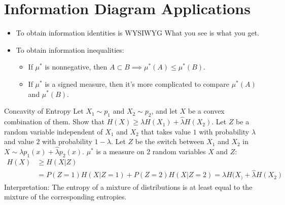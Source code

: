\documentclass[../main.tex]{subfiles}
\begin{document}
\section{Information Diagram Applications}
\begin{itemize}
    \item To obtain information identities is WYSIWYG What you see is what you get.
    \item To obtain information inequalities:\begin{itemize}
        \item If $\mu^*$ is nonnegative, then $A\subset B\implies \mu^*(A)\leq \mu^*(B)$.
        \item If $\mu^*$ is a signed measure, then it's more complicated to compare $\mu^*(A)$ and $\mu^*(B)$.
    \end{itemize}
\end{itemize}
\begin{pbox}{Concavity of Entropy}
    Let $X_1\sim p_1$ and $X_2\sim p_2$, and let $X$ be a convex combination of them. Show that $H(X)
    \geq \lambda H(X_1) + \hat{\lambda}H(X_2)$.
    \newline
    Let $Z$ be a random variable independent of $X_1$ and $X_2$ that takes value $1$ with probability $\lambda$ and value $2$ with probability $1-\lambda$. Let $Z$ be the switch between $X_1$ and $X_2$ in $X\sim \lambda p_1(x)+\hat{\lambda}p_2(x)$. $\mu^*$ is a measure on 2 random variables $X$ and $Z$:
    \begin{align*}
        H(X)&\geq H(X|Z)\\
        &= P(Z=1)H(X|Z=1) + P(Z=2)H(X|Z=2)
        =\lambda H(X_)+\hat{\lambda}H(X_2)
    \end{align*}
    Interpretation: The entropy of a mixture of distributions is at least equal to the mixture of the corresponding entropies.
\end{pbox}
\end{document}
